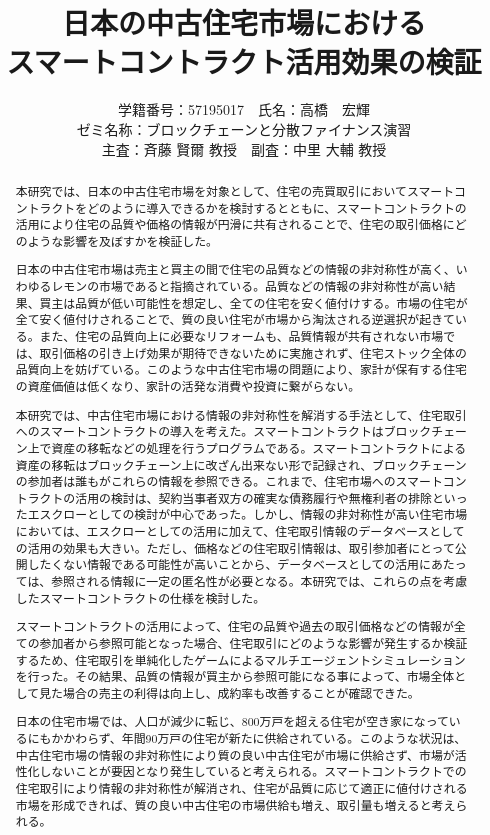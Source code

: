 \documentclass[a4paper,fontsize=11pt,report,notitlepage,line_length=38zw,number_of_lines=40,dvipdfmx]{jlreq}
\title{日本の中古住宅市場における\\スマートコントラクト活用効果の検証}
\author{
学籍番号：57195017　氏名：高橋　宏輝
\\ゼミ名称：ブロックチェーンと分散ファイナンス演習
\\主査：斉藤 賢爾 教授　副査：中里 大輔 教授}
\begin{document}
\date{}
\maketitle
\begin{abstract}
本研究では、日本の中古住宅市場を対象として、住宅の売買取引においてスマートコントラクトをどのように導入できるかを検討するとともに、スマートコントラクトの活用により住宅の品質や価格の情報が円滑に共有されることで、住宅の取引価格にどのような影響を及ぼすかを検証した。

日本の中古住宅市場は売主と買主の間で住宅の品質などの情報の非対称性が高く、いわゆるレモンの市場であると指摘されている。品質などの情報の非対称性が高い結果、買主は品質が低い可能性を想定し、全ての住宅を安く値付けする。市場の住宅が全て安く値付けされることで、質の良い住宅が市場から淘汰される逆選択が起きている。また、住宅の品質向上に必要なリフォームも、品質情報が共有されない市場では、取引価格の引き上げ効果が期待できないために実施されず、住宅ストック全体の品質向上を妨げている。このような中古住宅市場の問題により、家計が保有する住宅の資産価値は低くなり、家計の活発な消費や投資に繋がらない。

本研究では、中古住宅市場における情報の非対称性を解消する手法として、住宅取引へのスマートコントラクトの導入を考えた。スマートコントラクトはブロックチェーン上で資産の移転などの処理を行うプログラムである。スマートコントラクトによる資産の移転はブロックチェーン上に改ざん出来ない形で記録され、ブロックチェーンの参加者は誰もがこれらの情報を参照できる。これまで、住宅市場へのスマートコントラクトの活用の検討は、契約当事者双方の確実な債務履行や無権利者の排除といったエスクローとしての検討が中心であった。しかし、情報の非対称性が高い住宅市場においては、エスクローとしての活用に加えて、住宅取引情報のデータベースとしての活用の効果も大きい。ただし、価格などの住宅取引情報は、取引参加者にとって公開したくない情報である可能性が高いことから、データベースとしての活用にあたっては、参照される情報に一定の匿名性が必要となる。本研究では、これらの点を考慮したスマートコントラクトの仕様を検討した。

スマートコントラクトの活用によって、住宅の品質や過去の取引価格などの情報が全ての参加者から参照可能となった場合、住宅取引にどのような影響が発生するか検証するため、住宅取引を単純化したゲームによるマルチエージェントシミュレーションを行った。その結果、品質の情報が買主から参照可能になる事によって、市場全体として見た場合の売主の利得は向上し、成約率も改善することが確認できた。

日本の住宅市場では、人口が減少に転じ、800万戸を超える住宅が空き家になっているにもかかわらず、年間90万戸の住宅が新たに供給されている。このような状況は、中古住宅市場の情報の非対称性により質の良い中古住宅が市場に供給さず、市場が活性化しないことが要因となり発生していると考えられる。スマートコントラクトでの住宅取引により情報の非対称性が解消され、住宅が品質に応じて適正に値付けされる市場を形成できれば、質の良い中古住宅の市場供給も増え、取引量も増えると考えられる。

\end{abstract}
\end{document}
